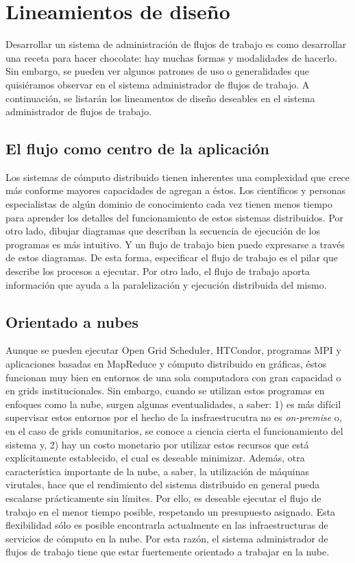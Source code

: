 \section{Lineamientos de diseño}

Desarrollar un sistema de administración de flujos de trabajo es como desarrollar una receta para hacer chocolate: hay muchas formas y modalidades de hacerlo. Sin embargo, se pueden ver algunos patrones de uso o generalidades que quisiéramos observar en el sistema administrador de flujos de trabajo. A continuación, se listarán los lineamentos de diseño deseables en el sistema administrador de flujos de trabajo.



\subsection{El flujo como centro de la aplicación}

Los sistemas de cómputo distribuido tienen inherentes una complexidad que crece más conforme mayores capacidades de agregan a éstos. Los científicos y personas especialistas de algún dominio de conocimiento cada vez tienen menos tiempo para aprender los detalles del funcionamiento de estos sistemas distribuidos. Por otro lado, dibujar diagramas que describan la secuencia de ejecución de los programas es más intuitivo. Y un flujo de trabajo bien puede expresarse a través de estos diagramas. De esta forma, especificar el flujo de trabajo es el pilar que describe los procesos a ejecutar. Por otro lado, el flujo de trabajo aporta información que ayuda a la paralelización y ejecución distribuida del mismo.



\subsection{Orientado a nubes}

Aunque se pueden ejecutar Open Grid Scheduler, HTCondor, programas MPI y aplicaciones basadas en MapReduce y cómputo distribuido en gráficas, éstos funcionan muy bien en entornos de una sola computadora con gran capacidad o en grids institucionales. Sin embargo, cuando se utilizan estos programas en enfoques como la nube, surgen algunas eventualidades, a saber: 1) es más difícil supervisar estos entornos por el hecho de la insfraestrucutra no es \emph{on-premise} o, en el caso de grids comunitarios, se conoce a ciencia cierta el funcionamiento del sistema y, 2) hay un costo monetario por utilizar estos recursos que está explícitamente establecido, el cual es deseable minimizar. Además, otra característica importante de la nube, a saber, la utilización de máquinas virutales, hace que el rendimiento del sistema distribuido en general pueda escalarse prácticamente sin límites. Por ello, es deseable ejecutar el flujo de trabajo en el menor tiempo posible, respetando un presupuesto asignado. Esta flexibilidad sólo es posible encontrarla actualmente en las infraestructuras de servicios de cómputo en la nube. Por esta razón, el sistema administrador de flujos de trabajo tiene que estar fuertemente orientado a trabajar en la nube.



